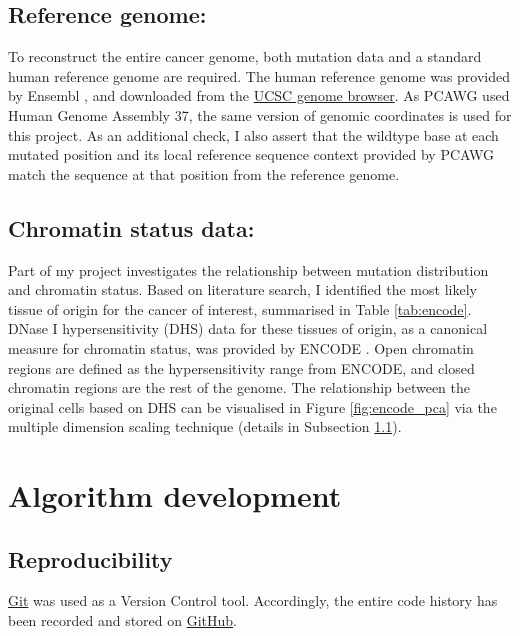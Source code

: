 \subsection{Reference genome:} 
To reconstruct the entire cancer genome, both mutation data and a standard human reference genome are required. The human reference genome was provided by Ensembl \citep{Yates2020Ensembl2020}, and downloaded from the \href{http://hgdownload.soe.ucsc.edu/goldenPath/hg19/chromosomes}{UCSC genome browser}. As PCAWG used Human Genome Assembly 37, the same version of genomic coordinates is used for this project. As an additional check, I also assert that the wildtype base at each mutated position and its local reference sequence context provided by PCAWG match the sequence at that position from the reference genome. 

\subsection{Chromatin status data:} 
Part of my project investigates the relationship between mutation distribution and chromatin status. Based on literature search, I identified the most likely tissue of origin for the cancer of interest, summarised in Table \ref{tab:encode}. DNase I hypersensitivity (DHS) data for these tissues of origin, as a canonical measure for chromatin status, was provided by ENCODE \citep[downloaded from either \href{https://genome.ucsc.edu/cgi-bin/hgFileUi?db=hg19&g=wgEncodeOpenChromDnase}{Duke} or \href{https://genome.ucsc.edu/cgi-bin/hgFileUi?db=hg19&g=wgEncodeUwDnase}{UW};][]{Thurman2012TheGenome,Klemm2019ChromatinEpigenome}. Open chromatin regions are defined as the hypersensitivity range from ENCODE, and closed chromatin regions are the rest of the genome. The relationship between the original cells based on DHS can be visualised in Figure \ref{fig:encode_pca} via the multiple dimension scaling technique (details in Subsection \ref{}). 

\section{Algorithm development}
\subsection{Reproducibility} 
\href{http://git-scm.com}{Git} was used as a Version Control tool. Accordingly, the entire code history has been recorded and stored on \href{https://github.com}{GitHub}.


